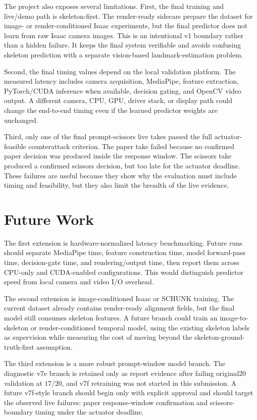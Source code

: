 \documentclass[conference]{IEEEtran}
\begin{document}
The project also exposes several limitations. First, the final training and live/demo path is skeleton-first. The render-ready sidecars prepare the dataset for image- or render-conditioned Isaac experiments, but the final predictor does not learn from raw Isaac camera images. This is an intentional v1 boundary rather than a hidden failure. It keeps the final system verifiable and avoids confusing skeleton prediction with a separate vision-based landmark-estimation problem.

Second, the final timing values depend on the local validation platform. The measured latency includes camera acquisition, MediaPipe, feature extraction, PyTorch/CUDA inference when available, decision gating, and OpenCV video output. A different camera, CPU, GPU, driver stack, or display path could change the end-to-end timing even if the learned predictor weights are unchanged.

Third, only one of the final prompt-scissors live takes passed the full actuator-feasible counterattack criterion. The paper take failed because no confirmed paper decision was produced inside the response window. The scissors take produced a confirmed scissors decision, but too late for the actuator deadline. These failures are useful because they show why the evaluation must include timing and feasibility, but they also limit the breadth of the live evidence.

\section{Future Work}

The first extension is hardware-normalized latency benchmarking. Future runs should separate MediaPipe time, feature construction time, model forward-pass time, decision-gate time, and rendering/output time, then report them across CPU-only and CUDA-enabled configurations. This would distinguish predictor speed from local camera and video I/O overhead.

The second extension is image-conditioned Isaac or SCHUNK training. The current dataset already contains render-ready alignment fields, but the final model still consumes skeleton features. A future branch could train an image-to-skeleton or render-conditioned temporal model, using the existing skeleton labels as supervision while measuring the cost of moving beyond the skeleton-ground-truth-first assumption.

The third extension is a more robust prompt-window model branch. The diagnostic v7e branch is retained only as report evidence after failing original20 validation at $17/20$, and v7f retraining was not started in this submission. A future v7f-style branch should begin only with explicit approval and should target the observed live failures: paper response-window confirmation and scissors-boundary timing under the actuator deadline.
\end{document}
